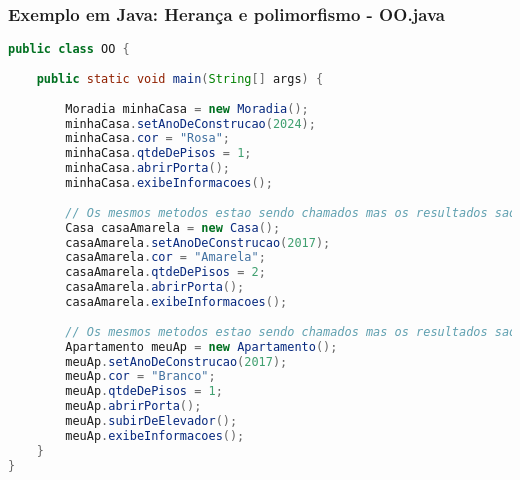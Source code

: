 \begin{frame}[fragile]
	\frametitle{Exemplo em Java: Herança e polimorfismo - OO.java}
	\begin{lstlisting}[language=java]
public class OO {
	
	public static void main(String[] args) {
		
		Moradia minhaCasa = new Moradia();
		minhaCasa.setAnoDeConstrucao(2024);
		minhaCasa.cor = "Rosa";
		minhaCasa.qtdeDePisos = 1;
		minhaCasa.abrirPorta();
		minhaCasa.exibeInformacoes();
		
		// Os mesmos metodos estao sendo chamados mas os resultados sao diferentes gracas a heranca e ao polimorfismo
		Casa casaAmarela = new Casa();
		casaAmarela.setAnoDeConstrucao(2017);
		casaAmarela.cor = "Amarela";
		casaAmarela.qtdeDePisos = 2;
		casaAmarela.abrirPorta();
		casaAmarela.exibeInformacoes();
		
		// Os mesmos metodos estao sendo chamados mas os resultados sao diferentes gracas a heranca e ao polimorfismo e mais, tambem ha um metodo a mais: subirDeElevador()
		Apartamento meuAp = new Apartamento();
		meuAp.setAnoDeConstrucao(2017);
		meuAp.cor = "Branco";
		meuAp.qtdeDePisos = 1;
		meuAp.abrirPorta();
		meuAp.subirDeElevador();
		meuAp.exibeInformacoes();
	}
}

	\end{lstlisting}
\end{frame}